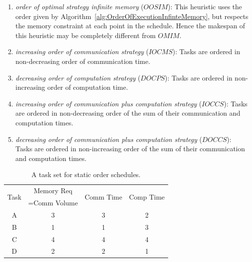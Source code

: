 \documentclass[sigconf]{acmart}
\begin{document}
	\begin{enumerate}[label=\roman*)]
		\item \textit{order  of  optimal strategy infinite memory} ($OOSIM$): This heuristic uses the order given by Algorithm~\ref{alg:OrderOfExecutionInfinteMemory}, but respects the memory constraint at each point in the schedule. Hence the makespan of this heuristic may be completely different from $OMIM$.
		
		\item \textit{increasing order of communication strategy} ($IOCMS$): Tasks are ordered  in non-decreasing order of communication time. 
		
		\item \textit{decreasing order of computation strategy} ($DOCPS$): Tasks are ordered in non-increasing order of computation time. 
		\item \textit{increasing order of communication plus computation strategy} ($IOCCS$): Tasks are ordered in non-decreasing order of the sum of their communication and computation times.
		\item \textit{decreasing order of communication plus computation strategy} ($DOCCS$): Tasks are ordered in non-increasing order of the sum of their communication and computation times.
		
	\end{enumerate}
	\begin{table}[htb]
		\begin{center}
			
			\begin{tabular}{|c|c|c|c|}
				\hline
				\multirow{2}{*}{Task} & Memory Req & \multirow{2}{*}{Comm Time} & \multirow{2}{*}{Comp Time}\\  
				&=Comm Volume && \\ \hline
				A & 3 & 3 &  2\\ \hline
				B & 1 & 1 & 3\\ \hline
				C & 4 & 4 & 4\\ \hline
				D & 2 & 2 & 1\\ \hline
			\end{tabular}
			\caption{\label{tab:staticOrderExample} A task set for static order schedules.}
		\end{center}
	\end{table}
	
\end{document}
